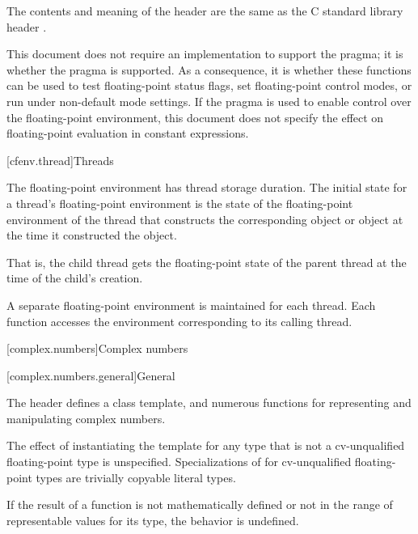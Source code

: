 \pnum
The contents and meaning of the header 
are the same as the C standard library header .
\begin{note}
This document does not require an implementation to support the
 pragma;
it is 
whether the pragma is supported. As a consequence,
it is 
whether these functions can be used to test floating-point status flags,
set floating-point control modes, or run under non-default mode settings.
If the pragma is used to enable control over the floating-point environment,
this document does not specify the effect on
floating-point evaluation in constant expressions.
\end{note}


[cfenv.thread]{Threads}

\pnum
The floating-point environment has thread storage
duration. The initial state for a thread's floating-point
environment is the state of the floating-point environment of the thread that constructs
the corresponding  object
or  object
at the time it
constructed the object.
\begin{note}
That is, the child thread gets the floating-point
state of the parent thread at the time of the child's creation.
\end{note}

\pnum
A separate floating-point environment is maintained for each thread. Each function
accesses the environment corresponding to its calling thread.

[complex.numbers]{Complex numbers}

[complex.numbers.general]{General}

\pnum
The header  defines a class template,
and numerous functions for representing and manipulating complex numbers.

\pnum
The effect of instantiating the template  for any type
that is not a cv-unqualified floating-point type
is unspecified.
Specializations of  for cv-unqualified floating-point types
are trivially copyable literal types.

\pnum
If the result of a function is not mathematically defined or not in
the range of representable values for its type, the behavior is
undefined.

